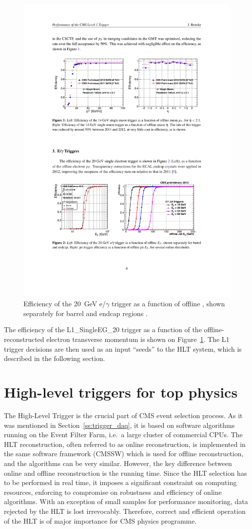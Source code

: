 \begin{figure}[!htbp]
  \centering
  \leavevmode
  \includegraphics[width=0.5\columnwidth]{L1_turnon}
  \caption{Efficiency of the \SI{20}{\GeV} e/$\gamma$ trigger as a function of offline \ET, shown separately for
  barrel and endcap regions \autocite{L1_Brooke}.}
  \label{fig:L1_seed_turn_on_curve}
\end{figure}

The efficiency of the L1\_SingleEG\_20 trigger as a function of the offline-reconstructed electron transverse momentum
is shown on Figure~\ref{fig:L1_seed_turn_on_curve}. The L1 trigger decisions are then used as an input ``seeds'' to the
HLT system, which is described in the following section.

\section{High-level triggers for top physics}
\label{s:hlt_for_top_physics}
The High-Level Trigger \autocite{HLT} is the crucial part of CMS event selection process. As it was mentioned in
Section~\ref{ss:trigger_daq}, it is based on software algorithms running on the Event Filter Farm, i.e.\ a large cluster
of commercial CPUs. The HLT reconstruction, often referred to as online reconstruction, is implemented in the same
software framework (CMSSW) which is used for offline reconstruction, and the algorithms can be very similar. However,
the key difference between online and offline reconstruction is the running time. Since the HLT selection has to be
performed in real time, it imposes a significant constraint on computing resources, enforcing to compromise on
robustness and efficiency of online algorithms. With an exception of small samples for performance monitoring, data
rejected by the HLT is lost irrevocably. Therefore, correct and efficient operation of the HLT is of major importance
for CMS physics programme.

